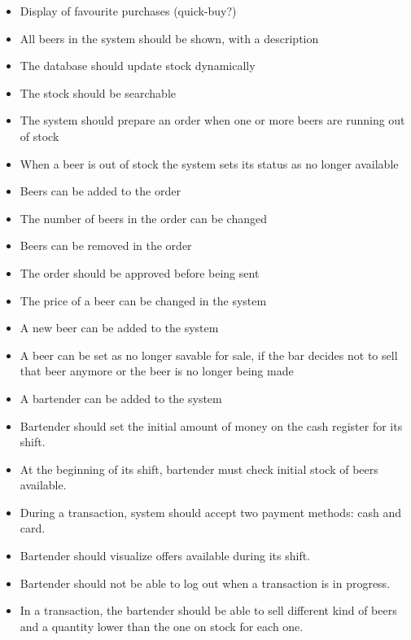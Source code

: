 \documentclass{article}
\begin{document}
\begin{itemize}
\begin{itemize}
  \end{itemize}
\item Display of favourite purchases (quick-buy?)
\item All beers in the system should be shown, with a description
\item The database should update stock dynamically
\item The stock should be searchable
\item The system should prepare an order when one or more beers are running out of stock
\item When a beer is out of stock the system sets its status as no longer available
\item Beers can be added to the order
\item The number of beers in the order can be changed
\item Beers can be removed in the order
\item The order should be approved before being sent
\item The price of a beer can be changed in the system
\item A new beer can be added to the system 
\item A beer can be set as no longer savable for sale, if the bar decides not to sell that beer anymore or the beer is no longer being made
\item A bartender can be added to the system
\item Bartender should set the initial amount of money on the cash register for its shift.
\item At the beginning of its shift, bartender must check initial stock of beers available.
\item During a transaction, system should accept two payment methods: cash and card.
\item Bartender should visualize offers available during its shift.
\item Bartender should not be able to log out when a transaction is in progress.
\item In a transaction, the bartender should be able to sell different kind of beers and a quantity lower than the one on stock for each one.
\end{itemize}
\end{document}
